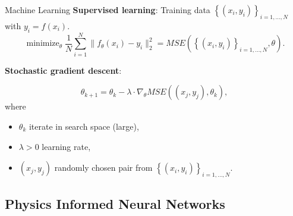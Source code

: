 \documentclass[9pt]{beamer}
\DeclareMathOperator*{\minimize}{minimize}
\begin{document}
\begin{frame}{Machine Learning}
    \textbf{Supervised learning}:
    Training data $\left\{ \left(x_i, y_i \right) \right\}_{i = 1, \ldots, N}$ with $y_i = f(x_i)$.
    \begin{equation*}
        \minimize_{\theta} \frac{1}{N} \sum_{i=1}^{N} \lVert f_{\theta} \left(x_{i}\right) - y_{i} \rVert^{2}_2 =  MSE \left( \left\{ \left(x_i, y_i \right) \right\}_{i = 1, \ldots, N}, \theta \right).  
    \end{equation*}

    \vspace{3mm}

    \textbf{Stochastic gradient descent}: 

    \begin{equation*}
        \label{Gradient Descent}
        \theta_{k+1} = \theta_k - \lambda \cdot \nabla_{\theta} MSE \left( \left(x_j, y_j \right), \theta_k \right),
    \end{equation*}
    where
    \begin{itemize}
        \item $\theta_k$ iterate in search space (large),
        \item $\lambda > 0$ learning rate,
        \item $\left(x_j, y_j \right)$ randomly chosen pair from $\left\{ \left(x_i, y_i \right) \right\}_{i = 1, \ldots, N}$.
    \end{itemize}
\end{frame}


\subsection{Physics Informed Neural Networks}
\end{document}
